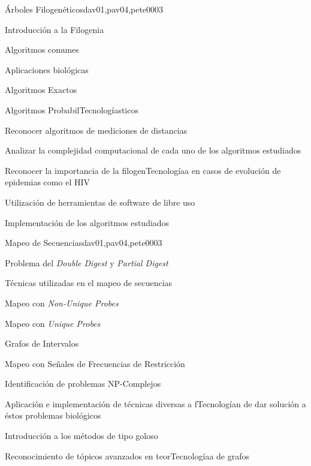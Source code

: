 \begin{syllabus}
\begin{unit}{Árboles Filogenéticos}{dav01,pav04,pete00}{0}{3}
\begin{topics}
        \item Introducción a la Filogenia
        \item Algoritmos comunes
        \item Aplicaciones biológicas
        \item Algoritmos Exactos
        \item Algoritmos ProbabilTecnologíasticos
    \end{topics}
    \begin{unitgoals}
        \item Reconocer algoritmos de mediciones de distancias
        \item Analizar la complejidad computacional de cada uno de los algoritmos estudiados
        \item Reconocer la importancia de la filogenTecnologíaa en casos de evolución de epidemias como el HIV
        \item Utilización de herramientas de software de libre uso
        \item Implementación de los algoritmos estudiados
    \end{unitgoals}
\end{unit}

\begin{unit}{Mapeo de Secuencias}{dav01,pav04,pete00}{0}{3}
\begin{topics}
        \item Problema del \textit{Double Digest} y \textit{Partial Digest}
        \item Técnicas utilizadas en el mapeo de secuencias
        \item Mapeo con \textit{Non-Unique Probes}
        \item Mapeo con \textit{Unique Probes}
        \item Grafos de Intervalos
        \item Mapeo con Señales de Frecuencias de Restricción
    \end{topics}
    \begin{unitgoals}
        \item Identificación de problemas NP-Complejos
        \item Aplicación e implementación de técnicas diversas a fTecnologían de dar solución a éstos problemas biológicos
        \item Introducción a los métodos de tipo goloso
        \item Reconocimiento de tópicos avanzados en teorTecnologíaa de grafos
    \end{unitgoals}
\end{unit}


\end{syllabus}
